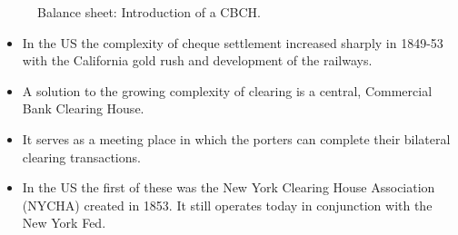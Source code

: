 \documentclass[20pt]{article}
\begin{document}
\begin{center}
\begin{figure}[H]
\begin{center}
\begin{tikzpicture}[auto, node distance=3cm,scale=(2/10),>=latex']


\end{tikzpicture}
\end{center}
\caption{Balance sheet: Introduction of a CBCH.}
\end{figure}
\end{center}

\begin{itemize}
    \item In the US the complexity of cheque settlement increased sharply in 1849-53 with the California gold rush and development of the railways.
    \item A solution to the growing complexity of clearing is a central, Commercial Bank Clearing House.
    \item It serves as a meeting place in which the porters can complete their bilateral clearing transactions.
    \item In the US the first of these was the New York Clearing House Association (NYCHA) created in 1853. It still operates today in conjunction with the New York Fed.
\end{itemize}

\end{document}
